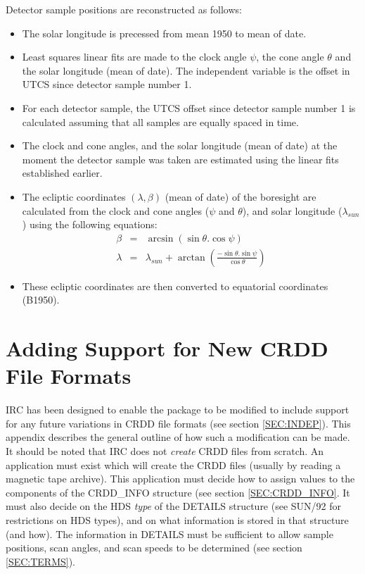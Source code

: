 Detector sample positions are reconstructed as follows:
\begin{itemize}
\item The solar longitude is precessed from mean 1950 to mean of date.
\item Least squares linear fits are made to the clock angle $\psi$, the cone
angle $\theta$ and the solar longitude (mean of date). The independent variable
is the offset in UTCS since detector sample number 1.
\item For each detector sample, the UTCS offset since detector sample number 1 is
calculated assuming that all samples are equally spaced in time.
\item The clock and cone angles, and the solar longitude (mean of date) at the
moment the detector sample was taken are estimated using the linear fits
established earlier.
\item The ecliptic coordinates $(\lambda,\beta)$ (mean of date) of the boresight
are calculated from the clock and cone angles ($\psi$ and $\theta$), and solar
longitude ($\lambda_{sun}$) using the following equations:
\begin{eqnarray*}
\beta & = & \arcsin( \sin \theta. \cos \psi )\\
\lambda & = & \lambda_{sun} + \arctan \left(\frac{-\sin \theta.\sin \psi}{\cos
\theta} \right)
\end{eqnarray*}
\item These ecliptic coordinates are then converted to equatorial coordinates
(B1950).
\end{itemize}

\section {Adding Support for New CRDD File Formats}
IRC has been designed to enable the package to be modified to include support
for any future variations in CRDD file formats (see section \ref {SEC:INDEP}).
This appendix describes the general outline of how such a modification can be
made. It should be noted that IRC does not {\em create} CRDD files from
scratch. An application must exist which will create the CRDD files (usually
by reading a magnetic tape archive). This application must decide how to
assign values  to the components of the CRDD\_INFO structure (see section
\ref{SEC:CRDD_INFO}. It must also decide on the HDS {\em type} of the DETAILS
structure (see SUN/92 for restrictions on HDS types), and on what information
is stored in that structure (and how). The
information in DETAILS must be sufficient to allow sample positions, scan
angles, and scan speeds to be determined (see section \ref{SEC:TERMS}).

